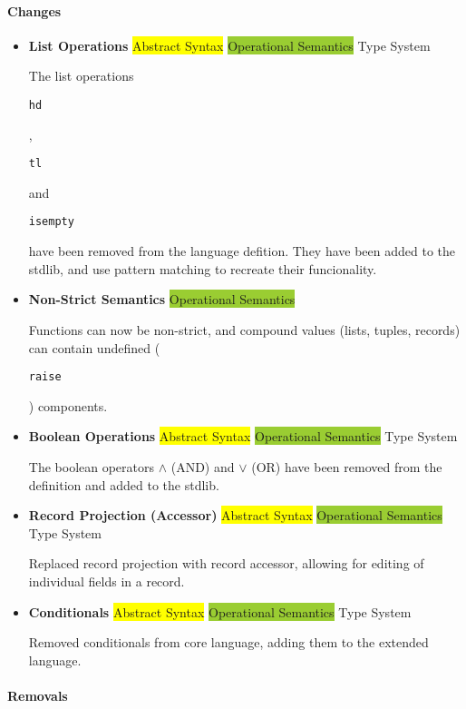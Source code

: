 \documentclass{article}
\def\code#1{\begin{footnotesize}\texttt{#1}\end{footnotesize}}
\begin{document}
\paragraph{Changes}

\begin{itemize}
  \item \textbf{List Operations} \; \; {\small\colorbox{yellow}{Abstract Syntax} \colorbox{YellowGreen}{Operational Semantics} \colorbox{ProcessBlue}{Type System}}

      The list operations \code{hd}, \code{tl} and \code{isempty} have been removed from the language defition.
      They have been added to the stdlib, and use pattern matching to recreate their funcionality.
\end{itemize}

\begin{itemize}
  \item \textbf{Non-Strict Semantics} \; \;
  { \colorbox{YellowGreen}{Operational Semantics}}

      Functions can now be non-strict, and compound values (lists, tuples, records) can contain undefined (\code{raise}) components.
\end{itemize}

\begin{itemize}
  \item \textbf{Boolean Operations} \; \;
  {\small\colorbox{yellow}{Abstract Syntax} \colorbox{YellowGreen}{Operational Semantics} \colorbox{ProcessBlue}{Type System}}

      The boolean operators $\wedge$ (AND) and $\vee$ (OR) have been removed from the definition and added to the stdlib.

  \item \textbf{Record Projection (Accessor)} \; \; {\small\colorbox{yellow}{Abstract Syntax} \colorbox{YellowGreen}{Operational Semantics} \colorbox{ProcessBlue}{Type System}}

      Replaced record projection with record accessor, allowing for editing of individual fields in a record.

  \item \textbf{Conditionals} \; \; {\small\colorbox{yellow}{Abstract Syntax} \colorbox{YellowGreen}{Operational Semantics} \colorbox{ProcessBlue}{Type System}}

      Removed conditionals from core language, adding them to the extended language.
\end{itemize}

\paragraph{Removals}
\end{document}
